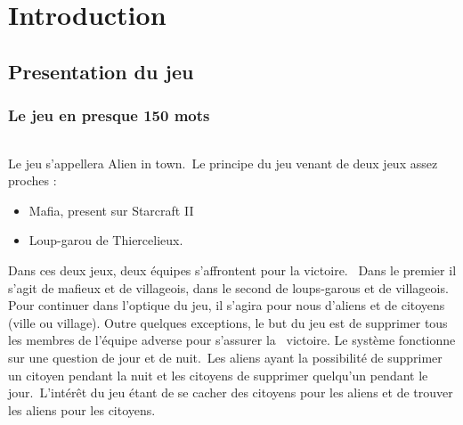 \chapter*{Introduction}

\section{Presentation du jeu}

\subsection{Le jeu en presque 150 mots}
\subparagraph{}
\textnormal{ Le jeu s'appellera Alien in town.\
Le principe du jeu venant de deux jeux assez proches :}
\begin{itemize}
\item \textnormal{Mafia, present sur Starcraft II}
\item \textnormal{Loup-garou de Thiercelieux.}
\end{itemize}
\textnormal{ Dans ces deux jeux, deux équipes s'affrontent pour la victoire. \
Dans le premier il s'agit de mafieux et de villageois, dans le second de loups-garous et de villageois.
Pour continuer dans l'optique du jeu, il s'agira pour nous d'aliens et de citoyens (ville ou village).
Outre quelques exceptions, le but du jeu est de supprimer tous les membres de l'équipe adverse pour s'assurer la \
victoire.
Le système fonctionne sur une question de jour et de nuit.\
Les aliens ayant la possibilité de supprimer un citoyen
pendant la nuit et les citoyens de supprimer quelqu'un pendant le jour.\
L'intérêt du jeu étant de se cacher des citoyens pour les aliens et de trouver les aliens pour les citoyens.}

